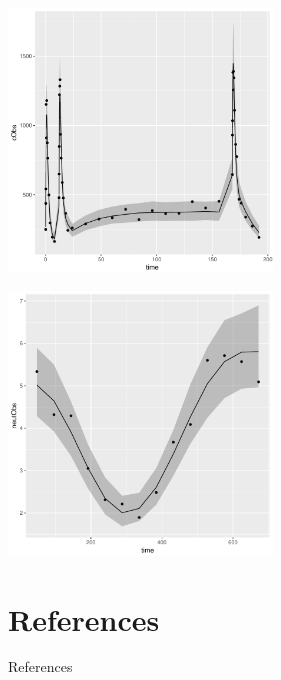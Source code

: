 \documentclass[xcolor=table]{beamer}
\begin{document}
\begin{frame}

  \begin{center}
    \includegraphics[width=7cm]{../figures/FKModelPlots005.pdf}
  \end{center}

\end{frame}

\begin{frame}

  \begin{center}
    \includegraphics[width=7cm]{../figures/FKModelPlots006.pdf}
  \end{center}

\end{frame}

\section{References}
\begin{frame}[allowframebreaks]{References}
\scriptsize
% 
%

  
\end{frame}
\end{document}
